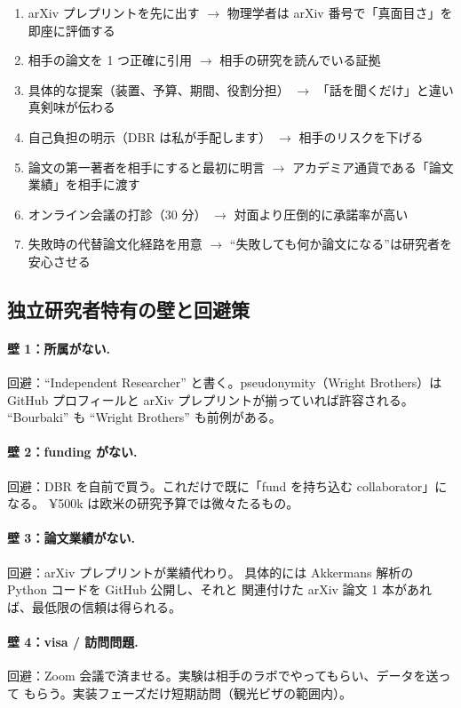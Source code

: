 \documentclass[11pt,a4paper]{article}
\def\textbf#1{#1}%
\begin{document}
\begin{enumerate}
\item \textbf{arXiv プレプリントを先に出す}
  $\to$ 物理学者は arXiv 番号で「真面目さ」を即座に評価する
\item \textbf{相手の論文を 1 つ正確に引用}
  $\to$ 相手の研究を読んでいる証拠
\item \textbf{具体的な提案（装置、予算、期間、役割分担）}
  $\to$ 「話を聞くだけ」と違い真剣味が伝わる
\item \textbf{自己負担の明示（DBR は私が手配します）}
  $\to$ 相手のリスクを下げる
\item \textbf{論文の第一著者を相手にする}と最初に明言
  $\to$ アカデミア通貨である「論文業績」を相手に渡す
\item \textbf{オンライン会議の打診（30 分）}
  $\to$ 対面より圧倒的に承諾率が高い
\item \textbf{失敗時の代替論文化経路を用意}
  $\to$ ``失敗しても何か論文になる''は研究者を安心させる
\end{enumerate}

\subsection{独立研究者特有の壁と回避策}

\paragraph{壁 1：所属がない.}
回避：``Independent Researcher'' と書く。pseudonymity（Wright Brothers）は
GitHub プロフィールと arXiv プレプリントが揃っていれば許容される。
``Bourbaki'' も ``Wright Brothers'' も前例がある。

\paragraph{壁 2：funding がない.}
回避：DBR を自前で買う。これだけで既に「fund を持ち込む collaborator」になる。
¥500k は欧米の研究予算では微々たるもの。

\paragraph{壁 3：論文業績がない.}
回避：arXiv プレプリントが業績代わり。
具体的には Akkermans 解析の Python コードを GitHub 公開し、それと
関連付けた arXiv 論文 1 本があれば、最低限の信頼は得られる。

\paragraph{壁 4：visa / 訪問問題.}
回避：Zoom 会議で済ませる。実験は相手のラボでやってもらい、データを送って
もらう。実装フェーズだけ短期訪問（観光ビザの範囲内）。
\end{document}
